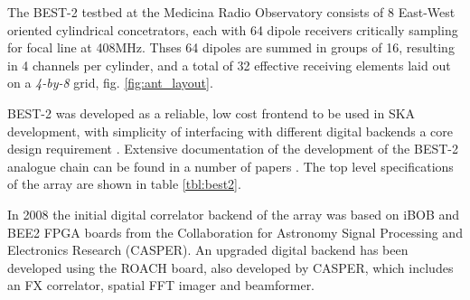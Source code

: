 \documentclass[useAMS,macros,usenatbib,onecolumn]{mn2e}
\begin{document}
The BEST-2 testbed at the Medicina Radio Observatory consists of 8 East-West oriented cylindrical concetrators, each with 64 dipole receivers critically sampling for focal line at 408MHz.
Thses 64 dipoles are summed in groups of 16, resulting in 4 channels per cylinder, and a total of 32 effective receiving elements laid out on a \emph{4-by-8} grid, fig. \ref{fig:ant_layout}.

BEST-2 was developed as a reliable, low cost frontend to be used in SKA development, with simplicity of interfacing with different digital backends a core design requirement \citep{best2}.
Extensive documentation of the development of the BEST-2 analogue chain can be found in a number of papers \citep{best2-lna} \citep{best2-rec}. The top level specifications of the array are shown in table \ref{tbl:best2}.


In 2008 the initial digital correlator backend of the array was based on iBOB and BEE2 FPGA boards from the Collaboration for Astronomy Signal Processing and Electronics Research (CASPER)\citep{best2-casper}.
An upgraded digital backend has been developed using the ROACH board, also developed by CASPER, which includes an FX correlator, spatial FFT imager and beamformer.
\end{document}
